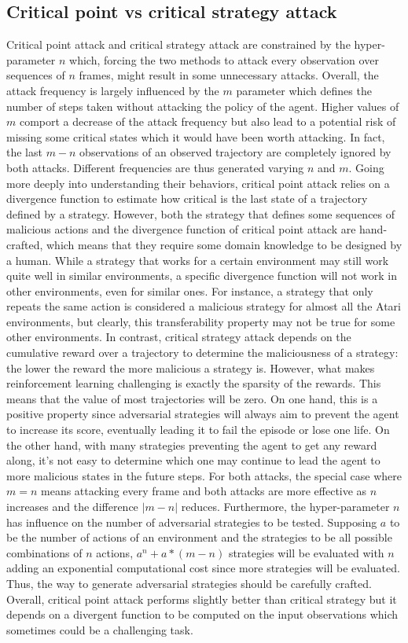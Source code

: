 \subsection{Critical point vs critical strategy attack}
Critical point attack and critical strategy attack are constrained by the hyper-parameter \(n\) which, forcing the two methods to attack every observation over sequences of \(n\) frames, might result in some unnecessary attacks. Overall, the attack frequency is largely influenced by the \(m\) parameter which defines the number of steps taken without attacking the policy of the agent. Higher values of \(m\) comport a decrease of the attack frequency but also lead to a potential risk of missing some critical states which it would have been worth attacking. In fact, the last \(m-n\) observations of an observed trajectory are completely ignored by both attacks. Different frequencies are thus generated varying \(n\) and \(m\). Going more deeply into understanding their behaviors, critical point attack relies on a divergence function to estimate how critical is the last state of a trajectory defined by a strategy. However, both the strategy that defines some sequences of malicious actions and the divergence function of critical point attack are hand-crafted, which means that they require some domain knowledge to be designed by a human. While a strategy that works for a certain environment may still work quite well in similar environments, a specific divergence function will not work in other environments, even for similar ones. For instance, a strategy that only repeats the same action is considered a malicious strategy for almost all the Atari environments, but clearly, this transferability property may not be true for some other environments. In contrast, critical strategy attack depends on the cumulative reward over a trajectory to determine the maliciousness of a strategy: the lower the reward the more malicious a strategy is. However, what makes reinforcement learning challenging is exactly the sparsity of the rewards. This means that the value of most trajectories will be zero. On one hand, this is a positive property since adversarial strategies will always aim to prevent the agent to increase its score, eventually leading it to fail the episode or lose one life. On the other hand, with many strategies preventing the agent to get any reward along, it's not easy to determine which one may continue to lead the agent to more malicious states in the future steps. For both attacks, the special case where \(m=n\) means attacking every frame and both attacks are more effective as \(n\) increases and the difference \(|m-n|\) reduces. Furthermore, the hyper-parameter \(n\) has influence on the number of adversarial strategies to be tested. Supposing \(a\) to be the number of actions of an environment and the strategies to be all possible combinations of \(n\) actions, \(a^n+a*(m-n)\) strategies will be evaluated with \(n\) adding an exponential computational cost since more strategies will be evaluated. Thus, the way to generate adversarial strategies should be carefully crafted. Overall, critical point attack performs slightly better than critical strategy but it depends on a divergent function to be computed on the input observations which sometimes could be a challenging task.

